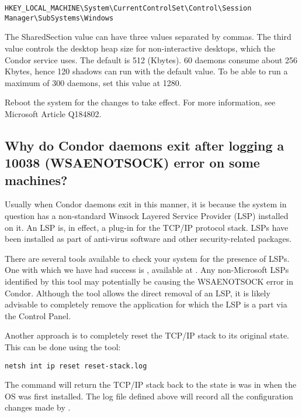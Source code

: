 \footnotesize
\begin{verbatim}
HKEY_LOCAL_MACHINE\System\CurrentControlSet\Control\Session Manager\SubSystems\Windows
\end{verbatim}
\normalsize

The SharedSection value can have three values separated by commas.
The third value controls the desktop heap size for non-interactive desktops,
which the Condor service uses.
The default is 512 (Kbytes).
60  daemons consume about 256 Kbytes,
hence 120 shadows can run with the default value.
To be able to run a maximum of 300  daemons,
set this value at 1280.

Reboot the system for the changes to take effect.
For more information,
see Microsoft Article Q184802.

\subsection*{Why do Condor daemons exit after logging a 10038 (WSAENOTSOCK) error on some machines?}

Usually when Condor daemons exit in this manner, it is because the system in
question has a non-standard Winsock Layered Service Provider (LSP) installed
on it. An LSP is, in effect, a plug-in for the TCP/IP protocol stack.
LSPs have been 
installed as part of anti-virus software and other security-related
packages.

There are several tools available to check your system for the
presence of LSPs. One with which we have had success is ,
available at .
Any non-Microsoft LSPs identified by
this tool may potentially be causing the WSAENOTSOCK error in Condor.
Although the  tool allows the direct removal of an LSP,
it is likely advisable to completely remove the application for which
the LSP is a part via the Control Panel.

Another approach is to completely reset the TCP/IP stack to its
original state.  This can be done using the \verb@netsh@ tool:
\begin{verbatim}
netsh int ip reset reset-stack.log
\end{verbatim}
The command will return the TCP/IP stack back to the state is was
in when the OS was first installed.  The log file defined above will
record all the configuration changes made by \verb@netsh@.

